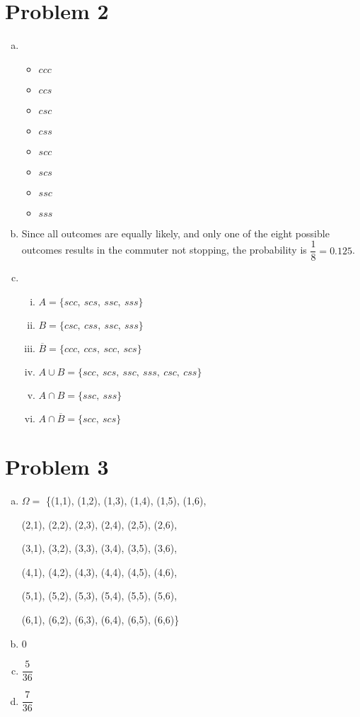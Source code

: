\documentclass[11pt]{article}
\begin{document}
\section*{Problem 2} 
	\begin{enumerate}[(a)]
		\item
		\begin{itemize}
			\item $ccc$
			\item $ccs$
			\item $csc$
			\item $css$
			\item $scc$
			\item $scs$
			\item $ssc$
			\item $sss$		
		\end{itemize}	
		
		\item
			Since all outcomes are equally likely, and only one of the eight possible 
			outcomes results in the commuter not stopping, the probability is $\dfrac{1}
			{8} = 0.125$.
			
		\item
			\begin{enumerate}[i.]
			\item $ A = \{ scc,\ scs,\ ssc,\ sss\}$
			\item $ B = \{ csc,\ css,\ ssc,\ sss\}$
			\item $ \overline{B} = \{ ccc,\ ccs,\ scc,\ scs \}$
			\item $ A \cup B = \{ scc,\ scs,\ ssc,\ sss,\ csc,\ css \}$
			\item $ A \cap B = \{ ssc,\ sss \}$
			\item $ A \cap \overline{B} = \{ scc,\ scs \}$
			\end{enumerate}
	\end{enumerate}
	
\section*{Problem 3}
	\begin{enumerate}[(a)]
		\item  $\Omega =$	\{(1,1),	(1,2),	(1,3), (1,4),	(1,5),	(1,6),
		
					(2,1),	(2,2),	(2,3),	(2,4),	(2,5),	(2,6),

					(3,1),	(3,2),	(3,3),	(3,4),	(3,5),	(3,6),

					(4,1),	(4,2),	(4,3),	(4,4),	(4,5),	(4,6),

					(5,1),	(5,2),	(5,3),	(5,4),	(5,5),	(5,6),

					(6,1),	(6,2),	(6,3),	(6,4),	(6,5),	(6,6)\}
					
		\item 0
		\item $\dfrac{5}{36}$
		\item $\dfrac{7}{36}$

	\end{enumerate}
	
\end{document}
